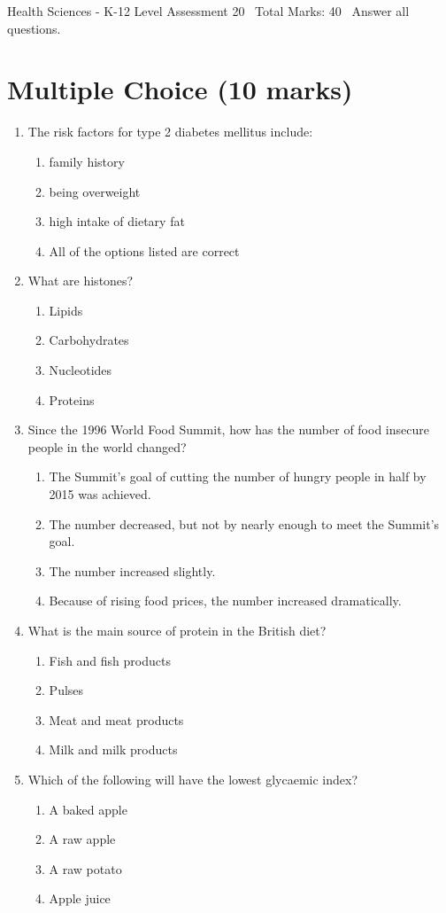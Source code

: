 \documentclass[12pt]{article}
\begin{document}
\begin{center}
Health Sciences - K-12 Level Assessment 20 \
Total Marks: 40 \
Answer all questions.
\end{center}

\section*{Multiple Choice (10 marks)}
\begin{enumerate}[label=\arabic*.]
\item The risk factors for type 2 diabetes mellitus include:
\begin{enumerate}[label=(\alph*)]
    \item family history
    \item being overweight
    \item high intake of dietary fat
    \item All of the options listed are correct
\end{enumerate}
\item What are histones?
\begin{enumerate}[label=(\alph*)]
    \item Lipids
    \item Carbohydrates
    \item Nucleotides
    \item Proteins
\end{enumerate}
\item Since the 1996 World Food Summit, how has the number of food insecure people in the world changed?
\begin{enumerate}[label=(\alph*)]
    \item The Summit's goal of cutting the number of hungry people in half by 2015 was achieved.
    \item The number decreased, but not by nearly enough to meet the Summit's goal.
    \item The number increased slightly.
    \item Because of rising food prices, the number increased dramatically.
\end{enumerate}
\item What is the main source of protein in the British diet?
\begin{enumerate}[label=(\alph*)]
    \item Fish and fish products
    \item Pulses
    \item Meat and meat products
    \item Milk and milk products
\end{enumerate}
\item Which of the following will have the lowest glycaemic index?
\begin{enumerate}[label=(\alph*)]
    \item A baked apple
    \item A raw apple
    \item A raw potato
    \item Apple juice
\end{enumerate}
\end{enumerate}
\end{document}
